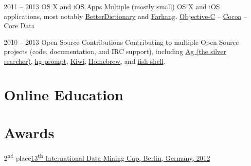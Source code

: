 \documentclass{tccv}
\begin{document}
\begin{project_list}
	 
	 
\item{2011 -- 2013}
	 {}
	 {OS X and iOS Apps}
	 {Multiple (mostly small) OS X and iOS applications, most notably \href{http://pooriaazimi.github.io/BetterDictionary/}{BetterDictionary} and \href{http://www.turnedondigital.com/?portfolio=farhang-iphone-app}{Farhang}.}
	 {
	 	\href{https://en.wikipedia.org/wiki/Objective-C}{Objective-C} -- 
		\href{https://en.wikipedia.org/wiki/Cocoa_(API)}{Cocoa} -- 
		\href{https://en.wikipedia.org/wiki/Core_Data}{Core Data}
	 }
	 


\item{2010 -- 2013}
	 {}
	 {Open Source Contributions}
	 {Contributing to multiple Open Source projects (code, documentation, and IRC support), including 
	 \href{https://github.com/ggreer/the_silver_searcher}{Ag (the silver searcher)}, 
	 \href{http://bitbucket.org/sjl/hg-prompt/}{hg-prompt}, \href{https://github.com/allending/Kiwi}{Kiwi}, 
	 \href{https://github.com/mxcl/homebrew}{Homebrew}, and 
	 \href{http://fishshell.com}{fish shell}.}
	 {}


\end{project_list}







\section{Online Education}









\section{Awards}

\begin{factlist}
\item{2\textsuperscript{nd} place}{\href{http://www.data-mining-cup.de/en/review/dmc-2012/}{13\textsuperscript{th} International Data Mining Cup, Berlin, Germany, 2012}}
\end{factlist}
\end{document}
